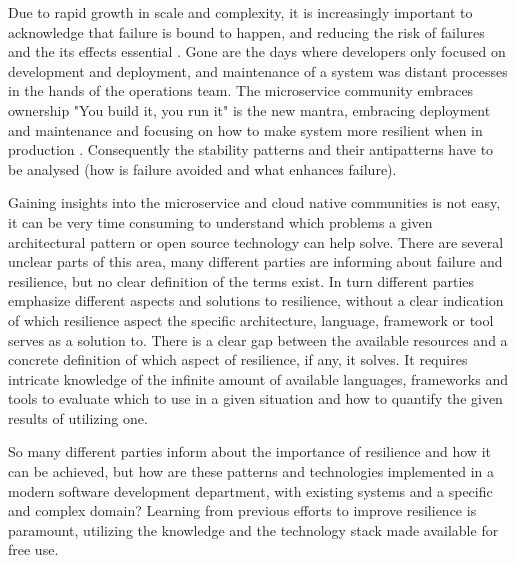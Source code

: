 Due to rapid growth in scale and complexity, it is increasingly important to acknowledge that failure is bound to happen, and reducing the risk of failures and the its effects essential \cite{abid2014toward} \cite[p. 117]{nygard2007release} \cite{tseitlin2013antifragile} \cite{krishnan2012weathering}. Gone are the days where developers only focused on development and deployment, and maintenance of a system was distant processes in the hands of the operations team. The microservice community embraces ownership "You build it, you run it" \cite{gray2006conversation} is the new mantra, embracing deployment and maintenance and focusing on how to make system more resilient when in production \cite[p.~6]{nygard2007release}. Consequently the stability patterns and their antipatterns have to be analysed (how is failure avoided and what enhances failure).

Gaining insights into the microservice and cloud native communities is not easy, it can be very time consuming to understand which problems a given architectural pattern or open source technology can help solve. There are several unclear parts of this area, many different parties are informing about failure and resilience, but no clear definition of the terms exist. In turn different parties emphasize different aspects and solutions to resilience, without a clear indication of which resilience aspect the specific architecture, language, framework or tool serves as a solution to. There is a clear gap between the available resources and a concrete definition of which aspect of resilience, if any, it solves. It requires intricate knowledge of the infinite amount of available languages, frameworks and tools to evaluate which to use in a given situation and how to quantify the given results of utilizing one.

So many different parties inform about the importance of resilience and how it can be achieved, but how are these patterns and technologies implemented in a modern software development department, with existing systems and a specific and complex domain? Learning from previous efforts to improve resilience is paramount, utilizing the knowledge and the technology stack made available for free use. 




